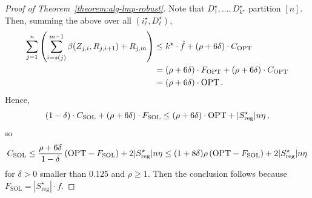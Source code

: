 \begin{proof}[Proof of Theorem~\ref{theorem:alg-lmp-robust}]
    Note that $D_1^\star, \ldots, D^\star_{k^\star}$ partition $[n]$. Then, summing the above over all $(i_{\ell}^\star, D^\star_{\ell})$,
    \begin{align*}
    \sum_{j=1}^n \left(\sum_{i=s(j)}^{m-1} \beta(Z_{j,i}, R_{j,i+1}) + R_{j, m}\right)
    &\leq k^\star \cdot \hat{f} + (\rho + 6 \delta) \cdot C_{\mathrm{OPT}}\\
    &= (\rho + 6 \delta) \cdot F_{\mathrm{OPT}} + (\rho+6\delta) \cdot C_{\mathrm{OPT}}\\
    &= (\rho + 6 \delta) \cdot \mathrm{OPT}\,.
    \end{align*}
    Hence, 
    \[(1-\delta) \cdot C_{\mathrm{SOL}} + (\rho + 6 \delta) \cdot F_{\mathrm{SOL}} \leq (\rho + 6 \delta) \cdot \mathrm{OPT} + |S_{\mathrm{reg}}^\star| n \eta\,,\]
    so 
    \[C_{\mathrm{SOL}} \leq \frac{\rho + 6 \delta}{1-\delta} \left(\mathrm{OPT} - F_{\mathrm{SOL}}\right) + 2 |S_{\mathrm{reg}}^\star| n \eta \leq (1+8\delta) \rho \left(\mathrm{OPT} - F_{\mathrm{SOL}}\right) + 2|S_{\mathrm{reg}}^\star| n \eta\]
    for $\delta > 0$ smaller than $0.125$ and $\rho \geq 1$.
    Then the conclusion follows because $F_{\mathrm{SOL}} = |S^\star_{\mathrm{reg}}| \cdot f$.
\end{proof}